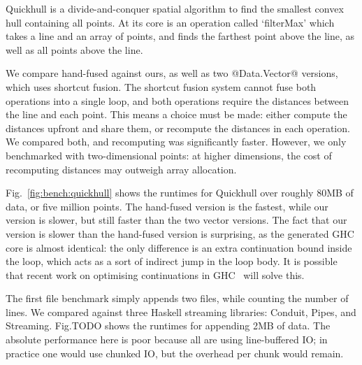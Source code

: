 Quickhull is a divide-and-conquer spatial algorithm to find the smallest convex hull containing all points.
At its core is an operation called `filterMax' which takes a line and an array of points, and finds the farthest point above the line, as well as all points above the line.

We compare hand-fused against ours, as well as two @Data.Vector@ versions, which uses shortcut fusion.
The shortcut fusion system cannot fuse both operations into a single loop, and both operations require the distances between the line and each point.
This means a choice must be made: either compute the distances upfront and share them, or recompute the distances in each operation.
We compared both, and recomputing was significantly faster.
However, we only benchmarked with two-dimensional points: at higher dimensions, the cost of recomputing distances may outweigh array allocation.

Fig.~\ref{fig:bench:quickhull} shows the runtimes for Quickhull over roughly 80MB of data, or five million points.
The hand-fused version is the fastest, while our version is slower, but still faster than the two vector versions.
The fact that our version is slower than the hand-fused version is surprising, as the generated GHC core is almost identical: the only difference is an extra continuation bound inside the loop, which acts as a sort of indirect jump in the loop body.
It is possible that recent work on optimising continuations in GHC~\cite{downen2016sequent} will solve this.


The first file benchmark simply appends two files, while counting the number of lines.
We compared against three Haskell streaming libraries: Conduit, Pipes, and Streaming.
Fig.TODO 
shows the runtimes for appending 2MB of data.
The absolute performance here is poor because all are using line-buffered IO; in practice one would use chunked IO, but the overhead per chunk would remain.

